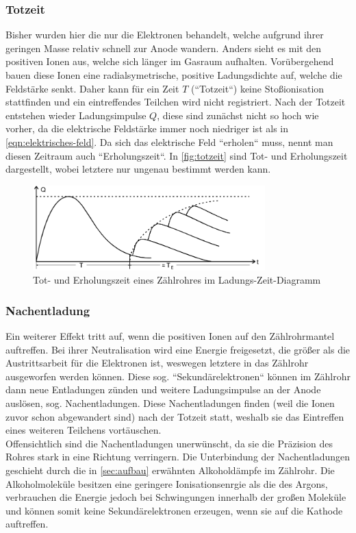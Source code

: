 \subsubsection{Totzeit}
\label{sec:totzeit}
Bisher wurden hier die nur die Elektronen behandelt, welche aufgrund ihrer geringen Masse relativ schnell zur Anode 
wandern. Anders sieht es mit den positiven Ionen aus, welche sich länger im Gasraum aufhalten. Vorübergehend bauen
diese Ionen eine radialsymetrische, positive Ladungsdichte auf, welche die Feldstärke senkt. Daher kann für ein Zeit
$T$ (``Totzeit``) keine Stoßionisation stattfinden und ein eintreffendes Teilchen wird nicht registriert. Nach der 
Totzeit
entstehen wieder Ladungsimpulse $Q$, diese sind zunächst nicht so hoch wie vorher, da die elektrische Feldstärke immer
noch niedriger ist als in \autoref{eqn:elektrisches-feld}. Da sich das elektrische Feld ``erholen`` muss, nennt man
diesen Zeitraum auch ``Erholungszeit``. 
In \autoref{fig:totzeit} sind Tot- und Erholungszeit dargestellt, wobei letztere nur ungenau bestimmt werden kann.
\begin{figure}[H]
	\centering
	\includegraphics[width=0.8\textwidth]{content/totzeit.png}
	\caption{Tot- und Erholungszeit eines Zählrohres im Ladungs-Zeit-Diagramm \cite{sample}}
	\label{fig:totzeit}
\end{figure}

\subsubsection{Nachentladung}
\label{sec:nachentladung}

Ein weiterer Effekt tritt auf, wenn die positiven Ionen auf den Zählrohrmantel auftreffen. Bei ihrer Neutralisation wird
eine Energie freigesetzt, die größer als die Austrittsarbeit für die Elektronen ist, weswegen letztere in das Zählrohr
ausgeworfen werden können. Diese sog. ``Sekundärelektronen`` können im Zählrohr dann neue Entladungen zünden und 
 weitere Ladungsimpulse an der Anode auslösen, sog. Nachentladungen. Diese Nachentladungen finden (weil die
Ionen zuvor schon abgewandert sind) nach der Totzeit statt, weshalb sie das Eintreffen eines weiteren Teilchens 
vortäuschen.
\\
Offensichtlich sind die Nachentladungen unerwünscht, da sie die Präzision des Rohres stark in eine Richtung verringern.
Die Unterbindung der Nachentladungen geschieht durch die in \autoref{sec:aufbau} erwähnten Alkoholdämpfe im 
Zählrohr. Die Alkoholmoleküle besitzen eine geringere Ionisationsenrgie als die des Argons, verbrauchen die Energie 
jedoch bei Schwingungen innerhalb der großen Moleküle und können somit keine Sekundärelektronen erzeugen, wenn sie 
auf die Kathode auftreffen.

